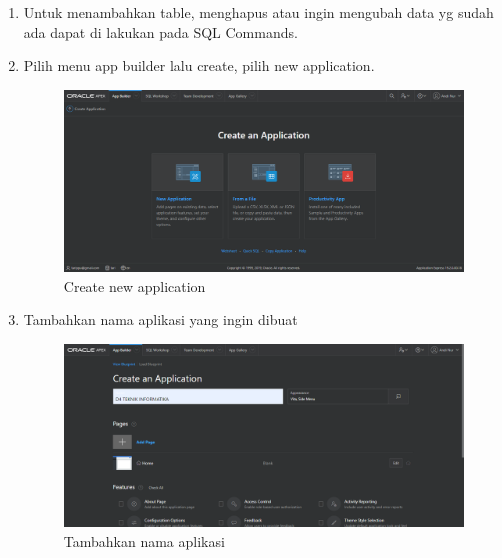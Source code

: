\begin{enumerate}
     \item Untuk menambahkan table, menghapus atau ingin mengubah data yg sudah ada dapat di lakukan pada SQL Commands. 

    \item Pilih menu app builder lalu create, pilih new application.
    \begin{figure}[!htbp]
        \centering
        \includegraphics[width=13cm]{figures/8.PNG}
        \caption{Create new application}
    \end{figure} 
    
    \newpage
    \item Tambahkan nama aplikasi yang ingin dibuat 
        \begin{figure}[!htbp]
        \centering
        \includegraphics[width=13cm]{figures/nameapp.PNG}
        \caption{Tambahkan nama aplikasi}
    \end{figure}
    

\end{enumerate}

